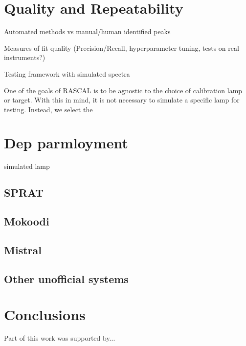 \documentclass{aa}
\begin{document}
\section{Quality and Repeatability}

Automated methods vs manual/human identified peaks

Measures of fit quality (Precision/Recall, hyperparameter tuning, tests on real instruments?)

Testing framework with simulated spectra

One of the goals of RASCAL is to be agnostic to the choice of calibration lamp or target. With 
this in mind, it is not necessary to simulate a specific lamp for testing. Instead, we select
the 

\section{Dep parmloyment}
simulated lamp
\subsection{SPRAT}

\subsection{Mokoodi}

\subsection{Mistral}

\subsection{Other unofficial systems}

\section{Conclusions}


\begin{acknowledgements}
      Part of this work was supported by...
\end{acknowledgements}

%
%



\end{document}
